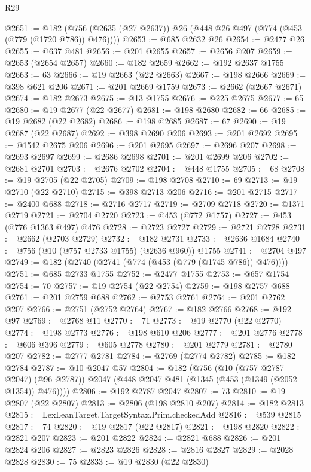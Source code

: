 \begin{lexlean}{R29}
\begin{coremodule}
@2651 := @182 (@756 (@2635 (@27 @2637)) @26 (@448 @26 @497 (@774 (@453 (@779 (@1720 @786)) @476))))
@2653 := @685 @2632 @26
@2654 := @2477 @26
@2655 := @637 @481
@2656 := @201 @2655
@2657 := @2656 @207
@2659 := @2653 (@2654 @2657)
@2660 := @182 @2659
@2662 := @192 @2637 @1755
@2663 := 63
@2666 := @19 @2663 (@22 @2663)
@2667 := @198 @2666
@2669 := @398 @621 @206
@2671 := @201 @2669 @1759
@2673 := @2662 (@2667 @2671)
@2674 := @182 @2673
@2675 := @13 @1755
@2676 := @225 @2675
@2677 := 65
@2680 := @19 @2677 (@22 @2677)
@2681 := @198 @2680
@2682 := 66
@2685 := @19 @2682 (@22 @2682)
@2686 := @198 @2685
@2687 := 67
@2690 := @19 @2687 (@22 @2687)
@2692 := @398 @2690 @206
@2693 := @201 @2692
@2695 := @1542 @2675 @206
@2696 := @201 @2695
@2697 := @2696 @207
@2698 := @2693 @2697
@2699 := @2686 @2698
@2701 := @201 @2699 @206
@2702 := @2681 @2701
@2703 := @2676 @2702
@2704 := @448 @1755
@2705 := 68
@2708 := @19 @2705 (@22 @2705)
@2709 := @198 @2708
@2710 := 69
@2713 := @19 @2710 (@22 @2710)
@2715 := @398 @2713 @206
@2716 := @201 @2715
@2717 := @2400 @688
@2718 := @2716 @2717
@2719 := @2709 @2718
@2720 := @1371 @2719
@2721 := @2704 @2720
@2723 := @453 (@772 @1757)
@2727 := @453 (@776 @1363 @497) @476
@2728 := @2723 @2727
@2729 := @2721 @2728
@2731 := @2662 (@2703 @2729)
@2732 := @182 @2731
@2733 := @2636 @1684
@2740 := @756 (@10 (@757 @2733 @1755) (@2636 @960)) @1755
@2741 := @2704 @497
@2749 := @182 (@2740 (@2741 (@774 (@453 (@779 (@1745 @786)) @476))))
@2751 := @685 @2733 @1755
@2752 := @2477 @1755
@2753 := @657 @1754
@2754 := 70
@2757 := @19 @2754 (@22 @2754)
@2759 := @198 @2757 @688
@2761 := @201 @2759 @688
@2762 := @2753 @2761
@2764 := @201 @2762 @207
@2766 := @2751 (@2752 @2764)
@2767 := @182 @2766
@2768 := @192 @97
@2769 := @2768 @11
@2770 := 71
@2773 := @19 @2770 (@22 @2770)
@2774 := @198 @2773
@2776 := @198 @610 @206
@2777 := @201 @2776
@2778 := @606 @396
@2779 := @605 @2778
@2780 := @201 @2779
@2781 := @2780 @207
@2782 := @2777 @2781
@2784 := @2769 (@2774 @2782)
@2785 := @182 @2784
@2787 := @10 @2047 @57
@2804 := @182
    (@756
      (@10 (@757 @2787 @2047) (@96 @2787))
      @2047
      (@448 @2047 @481 (@1345 (@453 (@1349 (@2052 @1354)) @476))))
@2806 := @192 @2787 @2047
@2807 := 73
@2810 := @19 @2807 (@22 @2807)
@2813 := @2806 (@198 @2810 @207)
@2814 := @182 @2813
@2815 := LexLeanTarget.TargetSyntax.Prim.checkedAdd
@2816 := @539 @2815
@2817 := 74
@2820 := @19 @2817 (@22 @2817)
@2821 := @198 @2820
@2822 := @2821 @207
@2823 := @201 @2822
@2824 := @2821 @688
@2826 := @201 @2824 @206
@2827 := @2823 @2826
@2828 := @2816 @2827
@2829 := @2028 @2828
@2830 := 75
@2833 := @19 @2830 (@22 @2830)

\end{coremodule}
\end{lexlean}
